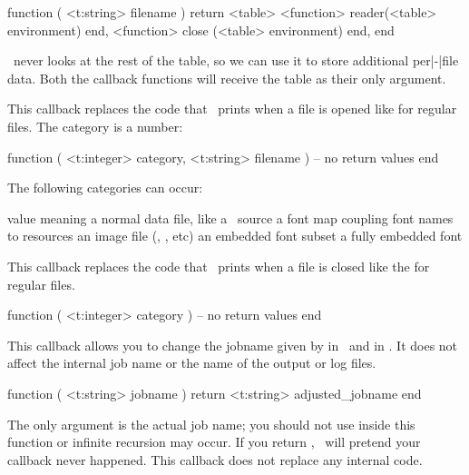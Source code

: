 \starttyping[option=LUA]
function (
    <t:string> filename
)
    return <table> {
        <function> reader(<table> environment) end,
        <function> close (<table> environment) end,
    }
end
\stoptyping

\LUAMETATEX\ never looks at the rest of the table, so we can use it to store
additional per|-|file data. Both the callback functions will receive the table as
their only argument.

\stopsubsection

\startsubsection[title=start_file]

This callback replaces the code that \LUAMETATEX\ prints when a file is opened like
 for regular files. The category is a number:

\starttyping[option=LUA]
function (
    <t:integer> category,
    <t:string>  filename
)
    -- no return values
end
\stoptyping

The following categories can occur:

\starttabulate[|c|l|]
\FL
\BC value  \BC meaning \NC \NR
\ML
{} \NC a normal data file, like a \TEX\ source \NC \NR
{} \NC a font map coupling font names to resources \NC \NR
{} \NC an image file (, , etc) \NC \NR
{} \NC an embedded font subset \NC \NR
{} \NC a fully embedded font \NC \NR
\LL
\stoptabulate

\stopsubsection

\startsubsection[title=stop_file]

This callback replaces the code that \LUAMETATEX\ prints when a file is closed like
the \type {)} for regular files.

\starttyping[option=LUA]
function (
    <t:integer> category
)
    -- no return values
end
\stoptyping

\stopsubsection

\stopsection

\startsection[title=Running]

\startsubsection[title=process_jobname]

This callback allows you to change the jobname given by \type {\jobname} in \TEX\
and  in \LUA. It does not affect the internal job name or the
name of the output or log files.

\starttyping[option=LUA]
function (
    <t:string> jobname
)
    return <t:string> adjusted_jobname
end
\stoptyping

The only argument is the actual job name; you should not use 
inside this function or infinite recursion may occur. If you return \type {nil},
\LUAMETATEX\ will pretend your callback never happened. This callback does not
replace any internal code.

